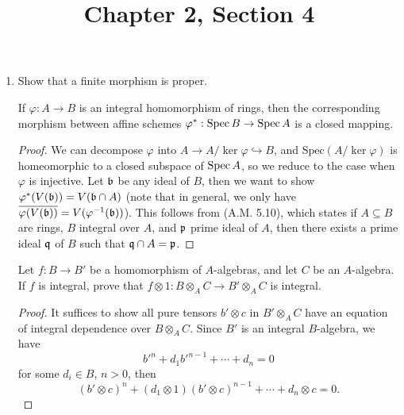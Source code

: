 \documentclass[a4paper]{article}
\title{Chapter 2, Section 4}
\begin{document}
\maketitle
\begin{enumerate} [label=\textbf{\arabic*.}, leftmargin=0em]

\item[\textbf{1.}] Show that a finite morphism is proper.

\begin{lemma}
    If $\varphi : A \to B$ is an integral homomorphism of rings, then the corresponding morphism between affine schemes $\varphi^* : \operatorname{Spec}{B} \to \operatorname{Spec}{A}$ is a closed mapping. 
\end{lemma}

\begin{proof}
    We can decompose $\varphi$ into $A \to A / \ker{\varphi} \hookrightarrow B$, and $\text{Spec}(A / \ker{\varphi})$ is homeomorphic to a closed subspace of $\operatorname{Spec}{A}$, so we reduce to the case when $\varphi$ is injective. Let $\mathfrak{b}$ be any ideal of $B$, then we want to show $\varphi^*(V(\mathfrak{b})) = V(\mathfrak{b} \cap A)$ (note that in general, we only have $\overline{\varphi(V(\mathfrak{b}))} = V(\varphi^{-1}(\mathfrak{b}))$). This follows from (A.M. 5.10), which states if $A \subseteq B$ are rings, $B$ integral over $A$, and $\mathfrak{p}$ prime ideal of $A$, then there exists a prime ideal $\mathfrak{q}$ of $B$ such that $\mathfrak{q} \cap A = \mathfrak{p}$.
\end{proof}

\begin{lemma}
    Let $f : B \to B'$ be a homomorphism of $A$-algebras, and let $C$ be an $A$-algebra. If $f$ is integral, prove that $f \otimes 1 : B \otimes_A C \to B' \otimes_A C$ is integral.
\end{lemma}

\begin{proof}
    It suffices to show all pure tensors $b'\otimes c$ in $B'\otimes_A C$ have an equation of integral dependence over $B\otimes_A C$. Since $B'$ is an integral $B$-algebra, we have $$b'^n + d_1 b'^{n - 1} + \cdots + d_n = 0$$ for some $d_i \in B$, $n > 0$, then 
    \begin{equation*}
        (b' \otimes c)^n + (d_1 \otimes 1)(b' \otimes c)^{n - 1} + \cdots + d_n \otimes c = 0.
    \end{equation*}
\end{proof}


\end{enumerate}
\end{document}
